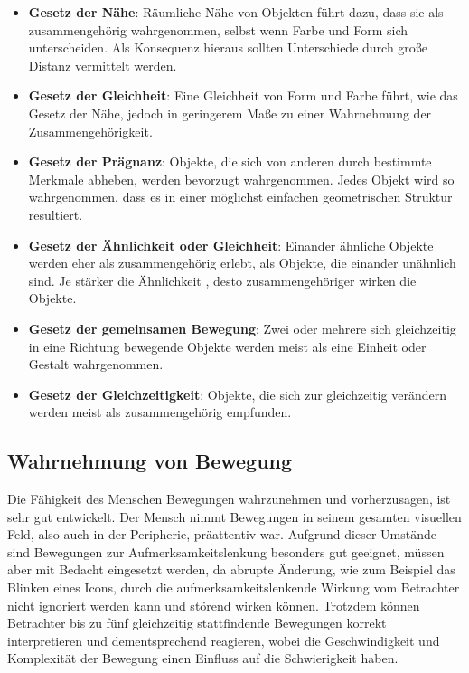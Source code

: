 \begin{itemize}
    \item \textbf{Gesetz der Nähe}: Räumliche Nähe von Objekten führt dazu, dass sie als zusammengehörig wahrgenommen, selbst wenn Farbe und Form sich unterscheiden. Als Konsequenz hieraus sollten Unterschiede durch große Distanz vermittelt werden. \cite[S. 56]{2010.Preim}
    \item \textbf{Gesetz der Gleichheit}: Eine Gleichheit von Form und Farbe führt, wie das Gesetz der Nähe, jedoch in geringerem Maße zu einer Wahrnehmung der Zusammengehörigkeit. \cite[S. 56]{2010.Preim}
    \item \textbf{Gesetz der Prägnanz}: Objekte, die sich von anderen durch bestimmte Merkmale abheben, werden bevorzugt wahrgenommen. Jedes Objekt wird so wahrgenommen, dass es in einer möglichst einfachen geometrischen Struktur resultiert. \cite{Gestaltgesetze}
    \item \textbf{Gesetz der Ähnlichkeit oder Gleichheit}: Einander ähnliche Objekte werden eher als zusammengehörig erlebt, als Objekte, die einander unähnlich sind. Je stärker die Ähnlichkeit , desto zusammengehöriger wirken die Objekte. \cite{Gestaltgesetze}
    \item \textbf{Gesetz der gemeinsamen Bewegung}: Zwei oder mehrere sich gleichzeitig in eine Richtung bewegende Objekte werden meist als eine Einheit oder Gestalt wahrgenommen. \cite{Gestaltgesetze}
    \item \textbf{Gesetz der Gleichzeitigkeit}: Objekte, die sich zur gleichzeitig verändern werden meist als zusammengehörig empfunden. \cite{Gestaltgesetze}
\end{itemize}

\subsection{Wahrnehmung von Bewegung}

Die Fähigkeit des Menschen Bewegungen wahrzunehmen und vorherzusagen, ist sehr gut entwickelt. Der Mensch nimmt Bewegungen in seinem gesamten visuellen Feld, also auch in der Peripherie, präattentiv war. Aufgrund dieser Umstände sind Bewegungen zur Aufmerksamkeitslenkung besonders gut geeignet, müssen aber mit Bedacht eingesetzt werden, da abrupte Änderung, wie zum Beispiel das Blinken eines Icons, durch die aufmerksamkeitslenkende Wirkung vom Betrachter nicht ignoriert werden kann und störend wirken können. Trotzdem können Betrachter bis zu fünf gleichzeitig stattfindende Bewegungen korrekt interpretieren und dementsprechend reagieren, wobei die Geschwindigkeit und Komplexität der Bewegung einen Einfluss auf die Schwierigkeit haben. \cite[S. 60 f.]{2010.Preim}

